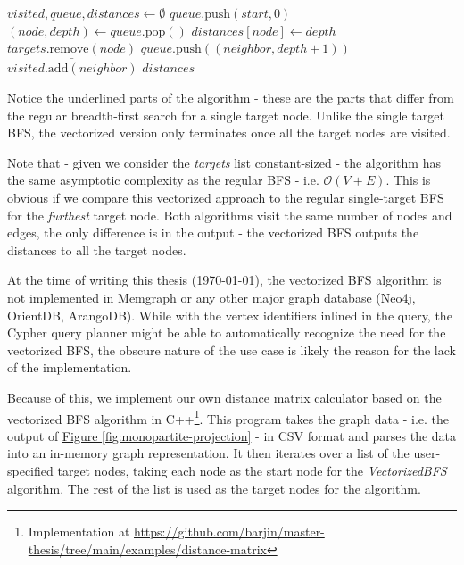 \begin{algorithmic}[1]
        \State $visited, queue, distances \gets \emptyset$
        \State $queue.\text{push}(start, 0)$
            \State $(node, depth) \gets queue.\text{pop}()$
                \State $distances[node] \gets depth$
                \State $\underline{targets.\text{remove}(node)}$
            \EndIf
                    \State $queue.\text{push}((neighbor, depth + 1))$
                    \State $visited.\text{add}(neighbor)$
                \EndIf
            \EndFor
        \EndWhile
        \State \Return $distances$
    \EndFunction
\end{algorithmic}

Notice the underlined parts of the algorithm - these are the parts that differ from the regular breadth-first search for a single target node.
Unlike the single target BFS, the vectorized version only terminates once all the target nodes are visited.

Note that - given we consider the \textit{targets} list constant-sized - the algorithm has the same asymptotic complexity as the regular BFS - i.e. $\mathcal{O}(V + E)$.
This is obvious if we compare this vectorized approach to the regular single-target BFS for the \textit{furthest} target node.
Both algorithms visit the same number of nodes and edges, the only difference is in the output - the vectorized BFS outputs the distances to all the target nodes.

At the time of writing this thesis (\today), the vectorized BFS algorithm is not implemented
in Memgraph or any other major graph database (Neo4j, OrientDB, ArangoDB). 
While with the vertex identifiers inlined in the query, the Cypher query planner might be able to automatically recognize the 
need for the vectorized BFS, the obscure nature of the use case is likely the reason for the lack of the implementation.

Because of this, we implement our own distance matrix calculator based on the vectorized BFS algorithm in C++\footnote{Implementation at \url{https://github.com/barjin/master-thesis/tree/main/examples/distance-matrix}}.
This program takes the graph data - i.e. the output of \hyperref[fig:monopartite-projection]{Figure \ref*{fig:monopartite-projection}} - in CSV format and parses the data into an in-memory graph representation.
It then iterates over a list of the user-specified target nodes, taking each node as the start node for the \textit{VectorizedBFS} algorithm.
The rest of the list is used as the target nodes for the algorithm. 

